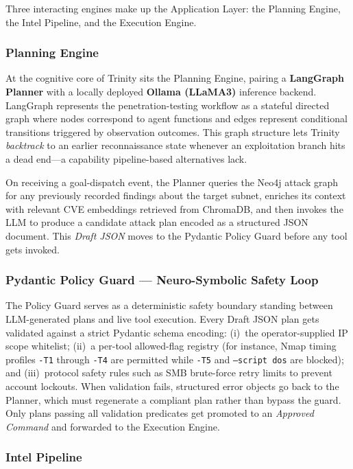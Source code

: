 \documentclass[conference]{IEEEtran}
\begin{document}
Three interacting engines make up the Application Layer: the Planning Engine, the Intel Pipeline, and the Execution Engine.

\subsubsection{Planning Engine}

At the cognitive core of Trinity sits the Planning Engine, pairing a \textbf{LangGraph Planner} with a locally deployed \textbf{Ollama (LLaMA3)} inference backend. LangGraph represents the penetration-testing workflow as a stateful directed graph where nodes correspond to agent functions and edges represent conditional transitions triggered by observation outcomes. This graph structure lets Trinity \textit{backtrack} to an earlier reconnaissance state whenever an exploitation branch hits a dead end---a capability pipeline-based alternatives lack.

On receiving a goal-dispatch event, the Planner queries the Neo4j attack graph for any previously recorded findings about the target subnet, enriches its context with relevant CVE embeddings retrieved from ChromaDB, and then invokes the LLM to produce a candidate attack plan encoded as a structured JSON document. This \textit{Draft JSON} moves to the Pydantic Policy Guard before any tool gets invoked.

\subsubsection{Pydantic Policy Guard --- Neuro-Symbolic Safety Loop}

The Policy Guard serves as a deterministic safety boundary standing between LLM-generated plans and live tool execution. Every Draft JSON plan gets validated against a strict Pydantic schema encoding: (i)~the operator-supplied IP scope whitelist; (ii)~a per-tool allowed-flag registry (for instance, Nmap timing profiles \texttt{-T1} through \texttt{-T4} are permitted while \texttt{-T5} and \texttt{--script dos} are blocked); and (iii)~protocol safety rules such as SMB brute-force retry limits to prevent account lockouts. When validation fails, structured error objects go back to the Planner, which must regenerate a compliant plan rather than bypass the guard. Only plans passing all validation predicates get promoted to an \textit{Approved Command} and forwarded to the Execution Engine.

\subsubsection{Intel Pipeline}
\end{document}
